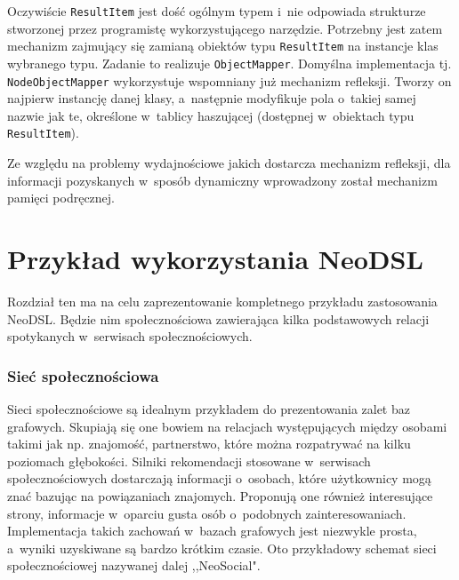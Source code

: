 \documentclass{xmgr}
\begin{document}
Oczywiście \texttt{ResultItem} jest dość ogólnym typem i~nie odpowiada strukturze stworzonej przez programistę wykorzystującego narzędzie. Potrzebny jest zatem mechanizm zajmujący się zamianą obiektów typu \texttt{ResultItem} na instancje klas wybranego typu. Zadanie to realizuje \texttt{ObjectMapper}. Domyślna implementacja tj. \texttt{NodeObjectMapper} wykorzystuje wspomniany już mechanizm refleksji. Tworzy on najpierw instancję danej klasy, a~następnie modyfikuje pola o~takiej samej nazwie jak te, określone w~tablicy haszującej (dostępnej w~obiektach typu \texttt{ResultItem}).

Ze względu na problemy wydajnościowe jakich dostarcza mechanizm refleksji, dla informacji pozyskanych w~sposób dynamiczny wprowadzony został mechanizm pamięci podręcznej.

\chapter{Przykład wykorzystania NeoDSL}

Rozdział ten ma na celu zaprezentowanie kompletnego przykładu zastosowania NeoDSL. Będzie nim społecznościowa zawierająca kilka podstawowych relacji spotykanych w~serwisach społecznościowych.

\subsection{Sieć społecznościowa}

Sieci społecznościowe są idealnym przykładem do prezentowania zalet baz grafowych. Skupiają się one bowiem na relacjach występujących między osobami takimi jak np. znajomość, partnerstwo, które można rozpatrywać na kilku poziomach głębokości. Silniki rekomendacji stosowane w~serwisach społecznościowych dostarczają informacji o~osobach, które użytkownicy mogą znać bazując na powiązaniach znajomych. Proponują one również interesujące strony, informacje w~oparciu gusta osób o~podobnych zainteresowaniach. Implementacja takich zachowań w~bazach grafowych jest niezwykle prosta, a~wyniki uzyskiwane są bardzo krótkim czasie. Oto przykładowy schemat sieci społecznościowej nazywanej dalej ,,NeoSocial".
\end{document}
